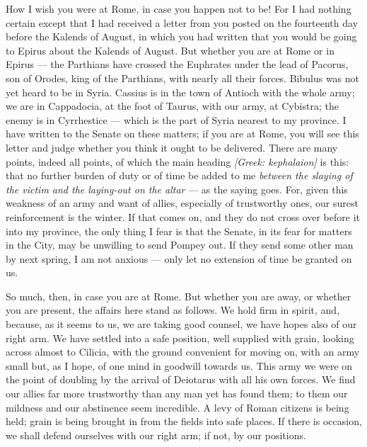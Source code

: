 

 How I wish you were at Rome, in case you happen not to be! For I had nothing certain except that I had received a letter from you posted on the fourteenth day before the Kalends of August, in which you had written that you would be going to Epirus about the Kalends of August. But whether you are at Rome or in Epirus --- the Parthians have crossed the Euphrates under the lead of Pacorus, son of Orodes, king of the Parthians, with nearly all their forces. Bibulus was not yet heard to be in Syria. Cassius is in the town of Antioch with the whole army; we are in Cappadocia, at the foot of Taurus, with our army, at Cybistra; the enemy is in Cyrrhestice --- which is the part of Syria nearest to my province. I have written to the Senate on these matters; if you are at Rome, you will see this letter and judge whether you think it ought to be delivered. There are many points, indeed all points, of which the main heading \textit{[Greek: kephalaion]} is this: that no further burden of duty or of time be added to me \textit{between the slaying of the victim and the laying-out on the altar} --- as the saying goes. For, given this weakness of an army and want of allies, especially of trustworthy ones, our surest reinforcement is the winter. If that comes on, and they do not cross over before it into my province, the only thing I fear is that the Senate, in its fear for matters in the City, may be unwilling to send Pompey out. If they send some other man by next spring, I am not anxious --- only let no extension of time be granted on us.

 So much, then, in case you are at Rome. But whether you are away, or whether you are present, the affairs here stand as follows. We hold firm in spirit, and, because, as it seems to us, we are taking good counsel, we have hopes also of our right arm. We have settled into a safe position, well supplied with grain, looking across almost to Cilicia, with the ground convenient for moving on, with an army small but, as I hope, of one mind in goodwill towards us. This army we were on the point of doubling by the arrival of Deiotarus with all his own forces. We find our allies far more trustworthy than any man yet has found them; to them our mildness and our abstinence seem incredible. A levy of Roman citizens is being held; grain is being brought in from the fields into safe places. If there is occasion, we shall defend ourselves with our right arm; if not, by our positions.

